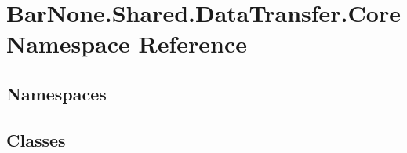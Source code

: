 \hypertarget{namespace_bar_none_1_1_shared_1_1_data_transfer_1_1_core}{}\section{Bar\+None.\+Shared.\+Data\+Transfer.\+Core Namespace Reference}
\label{namespace_bar_none_1_1_shared_1_1_data_transfer_1_1_core}
\subsection*{Namespaces}
\begin{DoxyCompactItemize}
\end{DoxyCompactItemize}
\subsection*{Classes}
